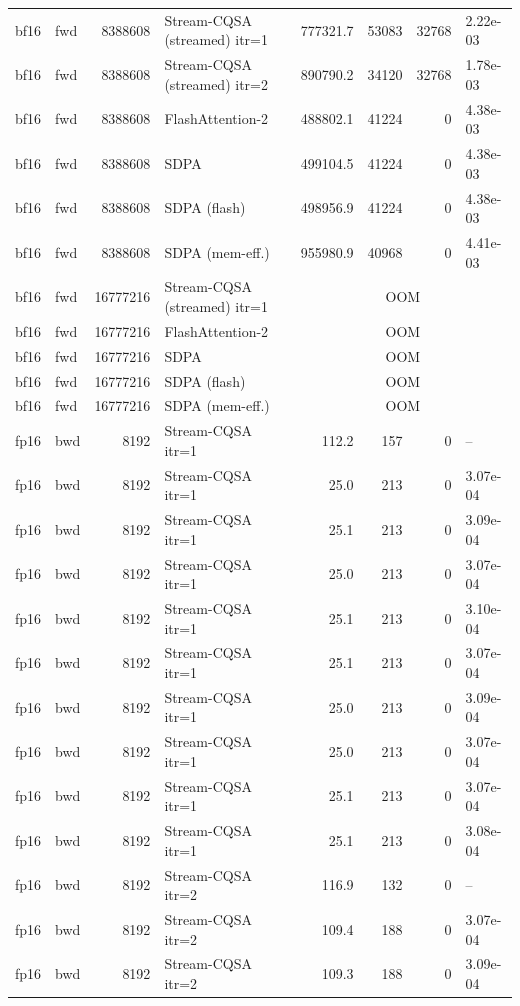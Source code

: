 \begin{tabular}{llrlrrrl}
bf16 & fwd & 8388608 & Stream-CQSA (streamed) itr=1 & 777321.7 & 53083 & 32768 & 2.22e-03 \\
bf16 & fwd & 8388608 & Stream-CQSA (streamed) itr=2 & 890790.2 & 34120 & 32768 & 1.78e-03 \\
bf16 & fwd & 8388608 & FlashAttention-2 & 488802.1 & 41224 & 0 & 4.38e-03 \\
bf16 & fwd & 8388608 & SDPA & 499104.5 & 41224 & 0 & 4.38e-03 \\
bf16 & fwd & 8388608 & SDPA (flash) & 498956.9 & 41224 & 0 & 4.38e-03 \\
bf16 & fwd & 8388608 & SDPA (mem-eff.) & 955980.9 & 40968 & 0 & 4.41e-03 \\
bf16 & fwd & 16777216 & Stream-CQSA (streamed) itr=1 & \multicolumn{4}{c}{OOM} \\
bf16 & fwd & 16777216 & FlashAttention-2 & \multicolumn{4}{c}{OOM} \\
bf16 & fwd & 16777216 & SDPA & \multicolumn{4}{c}{OOM} \\
bf16 & fwd & 16777216 & SDPA (flash) & \multicolumn{4}{c}{OOM} \\
bf16 & fwd & 16777216 & SDPA (mem-eff.) & \multicolumn{4}{c}{OOM} \\
fp16 & bwd & 8192 & Stream-CQSA itr=1 & 112.2 & 157 & 0 & -- \\
fp16 & bwd & 8192 & Stream-CQSA itr=1 & 25.0 & 213 & 0 & 3.07e-04 \\
fp16 & bwd & 8192 & Stream-CQSA itr=1 & 25.1 & 213 & 0 & 3.09e-04 \\
fp16 & bwd & 8192 & Stream-CQSA itr=1 & 25.0 & 213 & 0 & 3.07e-04 \\
fp16 & bwd & 8192 & Stream-CQSA itr=1 & 25.1 & 213 & 0 & 3.10e-04 \\
fp16 & bwd & 8192 & Stream-CQSA itr=1 & 25.1 & 213 & 0 & 3.07e-04 \\
fp16 & bwd & 8192 & Stream-CQSA itr=1 & 25.0 & 213 & 0 & 3.09e-04 \\
fp16 & bwd & 8192 & Stream-CQSA itr=1 & 25.0 & 213 & 0 & 3.07e-04 \\
fp16 & bwd & 8192 & Stream-CQSA itr=1 & 25.1 & 213 & 0 & 3.07e-04 \\
fp16 & bwd & 8192 & Stream-CQSA itr=1 & 25.1 & 213 & 0 & 3.08e-04 \\
fp16 & bwd & 8192 & Stream-CQSA itr=2 & 116.9 & 132 & 0 & -- \\
fp16 & bwd & 8192 & Stream-CQSA itr=2 & 109.4 & 188 & 0 & 3.07e-04 \\
fp16 & bwd & 8192 & Stream-CQSA itr=2 & 109.3 & 188 & 0 & 3.09e-04 \\

\end{tabular}
